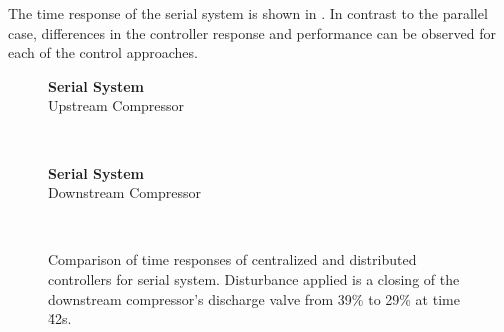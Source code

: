 The time response of the serial system is shown in .
In contrast to the parallel case, differences in the controller response and performance can be observed for each of the control approaches.

\ifmakeplots
\begin{figure}
  {\centering\large\textbf{Serial System}\\ Upstream Compressor\\[1em]}
  \begin{subfigure}{0.48\linewidth}
    \footnotesize
    
    \normalsize
  \end{subfigure}
  \hfill
  \begin{subfigure}{0.48\linewidth}
    \footnotesize
    
    \normalsize
  \end{subfigure}
  \\
  \begin{subfigure}{0.48\linewidth}
    \footnotesize
    
    \normalsize
  \end{subfigure}
  \hfill
  \begin{subfigure}{0.48\linewidth}
    \footnotesize
    
    \normalsize
  \end{subfigure}
\end{figure}

\begin{figure}
  \ContinuedFloat
  {\centering\large\textbf{Serial System}\\ Downstream Compressor\\[1em]}
  \begin{subfigure}{0.48\linewidth}
    \footnotesize
    
    \normalsize
  \end{subfigure}
  \hfill
  \begin{subfigure}{0.48\linewidth}
    \footnotesize
    
    \normalsize
  \end{subfigure}
  \\
  \begin{subfigure}{0.48\linewidth}
    \footnotesize
    
    \normalsize
  \end{subfigure}
  \hfill
  \begin{subfigure}{0.48\linewidth}
    \footnotesize
    
    \normalsize
  \end{subfigure}

  \caption{Comparison of time responses of centralized and distributed controllers for serial system. Disturbance applied is a closing of the downstream compressor's discharge valve from 39\% to 29\% at time \u{42}{s}.}
  \label{fig:res:serial-timeresp}
\end{figure}
\fi


